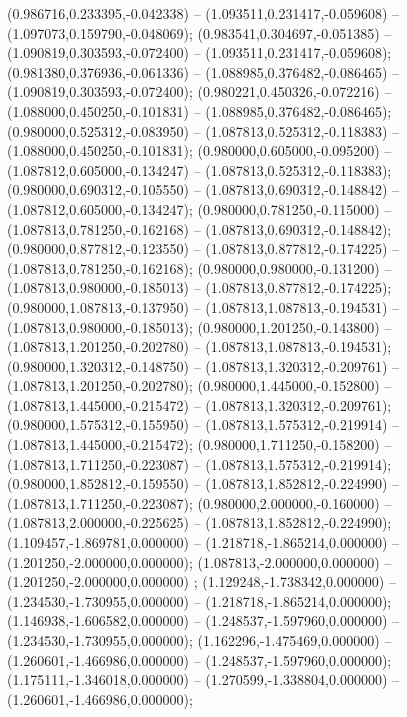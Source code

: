  (0.986716,0.233395,-0.042338) -- (1.093511,0.231417,-0.059608) -- (1.097073,0.159790,-0.048069);
 (0.983541,0.304697,-0.051385) -- (1.090819,0.303593,-0.072400) -- (1.093511,0.231417,-0.059608);
 (0.981380,0.376936,-0.061336) -- (1.088985,0.376482,-0.086465) -- (1.090819,0.303593,-0.072400);
 (0.980221,0.450326,-0.072216) -- (1.088000,0.450250,-0.101831) -- (1.088985,0.376482,-0.086465);
 (0.980000,0.525312,-0.083950) -- (1.087813,0.525312,-0.118383) -- (1.088000,0.450250,-0.101831);
 (0.980000,0.605000,-0.095200) -- (1.087812,0.605000,-0.134247) -- (1.087813,0.525312,-0.118383);
 (0.980000,0.690312,-0.105550) -- (1.087813,0.690312,-0.148842) -- (1.087812,0.605000,-0.134247);
 (0.980000,0.781250,-0.115000) -- (1.087813,0.781250,-0.162168) -- (1.087813,0.690312,-0.148842);
 (0.980000,0.877812,-0.123550) -- (1.087813,0.877812,-0.174225) -- (1.087813,0.781250,-0.162168);
 (0.980000,0.980000,-0.131200) -- (1.087813,0.980000,-0.185013) -- (1.087813,0.877812,-0.174225);
 (0.980000,1.087813,-0.137950) -- (1.087813,1.087813,-0.194531) -- (1.087813,0.980000,-0.185013);
 (0.980000,1.201250,-0.143800) -- (1.087813,1.201250,-0.202780) -- (1.087813,1.087813,-0.194531);
 (0.980000,1.320312,-0.148750) -- (1.087813,1.320312,-0.209761) -- (1.087813,1.201250,-0.202780);
 (0.980000,1.445000,-0.152800) -- (1.087813,1.445000,-0.215472) -- (1.087813,1.320312,-0.209761);
 (0.980000,1.575312,-0.155950) -- (1.087813,1.575312,-0.219914) -- (1.087813,1.445000,-0.215472);
 (0.980000,1.711250,-0.158200) -- (1.087813,1.711250,-0.223087) -- (1.087813,1.575312,-0.219914);
 (0.980000,1.852812,-0.159550) -- (1.087813,1.852812,-0.224990) -- (1.087813,1.711250,-0.223087);
 (0.980000,2.000000,-0.160000) -- (1.087813,2.000000,-0.225625) -- (1.087813,1.852812,-0.224990);
 (1.109457,-1.869781,0.000000) -- (1.218718,-1.865214,0.000000) -- (1.201250,-2.000000,0.000000);
 (1.087813,-2.000000,0.000000) -- (1.201250,-2.000000,0.000000) ;
 (1.129248,-1.738342,0.000000) -- (1.234530,-1.730955,0.000000) -- (1.218718,-1.865214,0.000000);
 (1.146938,-1.606582,0.000000) -- (1.248537,-1.597960,0.000000) -- (1.234530,-1.730955,0.000000);
 (1.162296,-1.475469,0.000000) -- (1.260601,-1.466986,0.000000) -- (1.248537,-1.597960,0.000000);
 (1.175111,-1.346018,0.000000) -- (1.270599,-1.338804,0.000000) -- (1.260601,-1.466986,0.000000);
